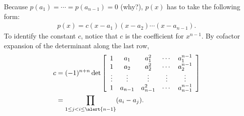 \documentclass[pdf,9pt]{beamer}
\begin{document}
\begin{frame}[fragile]
    \begin{proofnoend}[continued]
	   Because $p(a_1) = \cdots = p(a_{n-1}) = 0$ (why?), $p(x)$ has to take the following form:
	       \begin{align*}
		   p(x) = c (x-a_1)(x-a_2) \cdots (x-a_{n-1}) .
	       \end{align*}
	       \vfill
	       \vspace{2em}
	   To identify the constant $c$, notice that $c$ is the coefficient for $x^{n-1}$.
	       By cofactor expansion of the determinant along the last row,
	       \begin{align*}
		   c &= (-1)^{n+n}
		    \det\left[\begin{array}{ccccc}
          1      & a_1     & a_1^2     & \cdots & a_1^{n-1}\\
          1      & a_2     & a_2^2     & \cdots & a_2^{n-1}\\
          \vdots & \vdots  & \vdots    & \vdots & \vdots \\
          1      & a_{n-1} & a_{n-1}^2 & \cdots & a_{n-1}^{n-1} \\
		    \end{array}\right]\\
		     &= \prod_{1\leq j<i\leq \alert{n-1}  }(a_i-a_j).
	       \end{align*}
    \end{proofnoend}
\end{frame}
\end{document}
